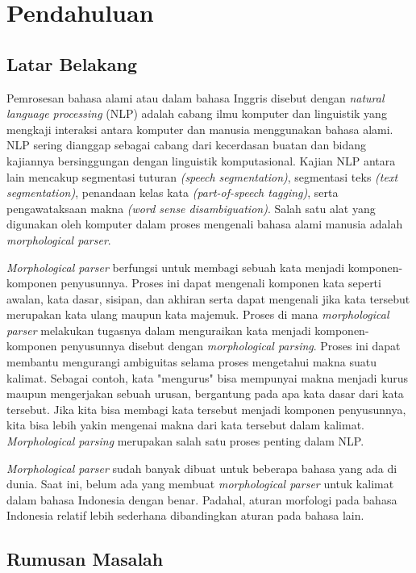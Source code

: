 \chapter{Pendahuluan}
\label{chap:pendahuluan}

\section{Latar Belakang}
\label{sec:latarBelakang}

Pemrosesan bahasa alami atau dalam bahasa Inggris disebut dengan {\it natural language processing} (NLP) adalah cabang ilmu komputer dan linguistik yang mengkaji interaksi antara komputer dan manusia menggunakan bahasa alami. NLP sering dianggap sebagai cabang dari kecerdasan buatan dan bidang kajiannya bersinggungan dengan linguistik komputasional. Kajian NLP antara lain mencakup segmentasi tuturan {\it (speech segmentation)}, segmentasi teks {\it (text segmentation)}, penandaan kelas kata {\it (part-of-speech tagging)}, serta pengawataksaan makna {\it (word sense disambiguation)}. Salah satu alat yang digunakan oleh komputer dalam proses mengenali bahasa alami manusia adalah {\it morphological parser}.

{\it Morphological parser} berfungsi untuk membagi sebuah kata menjadi komponen-komponen penyusunnya. Proses ini dapat mengenali komponen kata seperti awalan, kata dasar, sisipan, dan akhiran serta dapat mengenali jika kata tersebut merupakan kata ulang maupun kata majemuk. Proses di mana {\it morphological parser} melakukan tugasnya dalam menguraikan kata menjadi komponen-komponen penyusunnya disebut dengan {\it morphological parsing}. Proses ini dapat membantu mengurangi ambiguitas selama proses mengetahui makna suatu kalimat. Sebagai contoh, kata "mengurus" bisa mempunyai makna menjadi kurus maupun mengerjakan sebuah urusan, bergantung pada apa kata dasar dari kata tersebut. Jika kita bisa membagi kata tersebut menjadi komponen penyusunnya, kita bisa lebih yakin mengenai makna dari kata tersebut dalam kalimat. {\it Morphological parsing} merupakan salah satu proses penting dalam NLP.

{\it Morphological parser} sudah banyak dibuat untuk beberapa bahasa yang ada di dunia\cite{hasim:08:turkish}. Saat ini, belum ada yang membuat {\it morphological parser} untuk kalimat dalam bahasa Indonesia dengan benar. Padahal, aturan morfologi pada bahasa Indonesia relatif lebih sederhana dibandingkan aturan pada bahasa lain.


\section{Rumusan Masalah}
\label{sec:rumusanMasalah}

